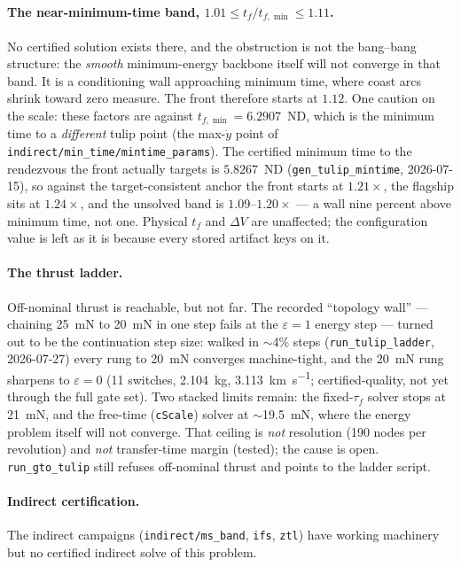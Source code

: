 \documentclass[11pt]{article}
\newcommand{\file}[1]{\texttt{#1}}
\begin{document}
\paragraph{The near-minimum-time band, $1.01 \le t_f/t_{f,\min} \le 1.11$.}
No certified solution exists there, and the obstruction is not the bang--bang
structure: the \emph{smooth} minimum-energy backbone itself will not converge
in that band. It is a conditioning wall approaching minimum time, where coast
arcs shrink toward zero measure. The front therefore starts at $1.12$.
One caution on the scale: these factors are against $t_{f,\min} = 6.2907$~ND,
which is the minimum time to a \emph{different} tulip point (the max-$\dot y$
point of \file{indirect/min\_time/mintime\_params}). The certified minimum time
to the rendezvous the front actually targets is $5.8267$~ND
(\file{gen\_tulip\_mintime}, 2026-07-15), so against the target-consistent
anchor the front starts at $1.21\times$, the flagship sits at $1.24\times$, and
the unsolved band is $1.09$--$1.20\times$ --- a wall nine percent above minimum
time, not one. Physical $t_f$ and $\Delta V$ are unaffected; the configuration
value is left as it is because every stored artifact keys on it.

\paragraph{The thrust ladder.} Off-nominal thrust is reachable, but not far.
The recorded ``topology wall'' --- chaining \SI{25}{\milli\newton} to
\SI{20}{\milli\newton} in one step fails at the $\varepsilon=1$ energy step ---
turned out to be the continuation step size: walked in $\sim$4\% steps
(\file{run\_tulip\_ladder}, 2026-07-27) every rung to \SI{20}{\milli\newton}
converges machine-tight, and the \SI{20}{\milli\newton} rung sharpens to
$\varepsilon=0$ (11 switches, \SI{2.104}{kg},
\SI{3.113}{\kilo\meter\per\second}; certified-quality, not yet through the full
gate set). Two stacked limits remain: the fixed-$\tau_f$ solver stops at
\SI{21}{\milli\newton}, and the free-time (\texttt{cScale}) solver at
$\sim$\SI{19.5}{\milli\newton}, where the energy problem itself will not
converge. That ceiling is \emph{not} resolution (190 nodes per revolution) and
\emph{not} transfer-time margin (tested); the cause is open.
\file{run\_gto\_tulip} still refuses off-nominal thrust and points to the
ladder script.

\paragraph{Indirect certification.} The indirect campaigns
(\file{indirect/ms\_band}, \file{ifs}, \file{ztl}) have working machinery but
no certified indirect solve of this problem.
\end{document}
